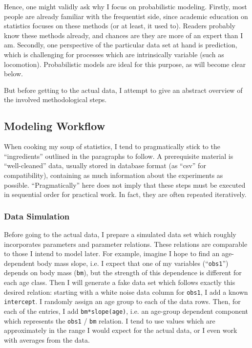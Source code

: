 Hence, one might validly ask why I focus on probabilistic modeling.
Firstly, most people are already familiar with the frequentist side, since academic education on statistics focuses on these methods (or at least, it used to).
Readers probably know these methods already, and chances are they are more of an expert than I am.
Secondly, one perspective of the particular data set at hand is prediction, which is challenging for processes which are intrinsically variable (such as locomotion).
Probabilistic models are ideal for this purpose, as will become clear below.

But before getting to the actual data, I attempt to give an abstract overview of the involved methodological steps.

\clearpage
\subsection{Modeling Workflow}
\label{intro:workflow}
When cooking my soup of statistics, I tend to pragmatically stick to the ``ingredients'' outlined in the paragraphs to follow.
A prerequisite material is ``well-cleaned'' data, usually stored in database format (as ``csv'' for compatibility), containing as much information about the experiments as possible.
``Pragmatically'' here does not imply that these steps must be executed in sequential order for practical work.
In fact, they are often repeated iteratively.


\subsubsection{Data Simulation}
\label{sec:org2c774e4}
Before going to the actual data, I prepare a simulated data set which roughly incorporates parameters and parameter relations.
These relations are comparable to those I intend to model later.
For example, imagine I hope to find an age-dependent body mass slope, i.e. I expect that one of my variables (``\texttt{obs1}'') depends on body mass (\texttt{bm}), but the strength of this dependence is different for each age class.
Then I will generate a fake data set which follows exactly this desired relation: starting with a white noise data column for \texttt{obs1}, I add a known \texttt{intercept}.
I randomly assign an age group to each of the data rows.
Then, for each of the entries, I add \texttt{bm*slope(age)}, i.e. an age-group dependent component which represents the \texttt{obs1} / \texttt{bm} relation.
I tend to use values which are approximately in the range I would expect for the actual data, or I even work with averages from the data.

